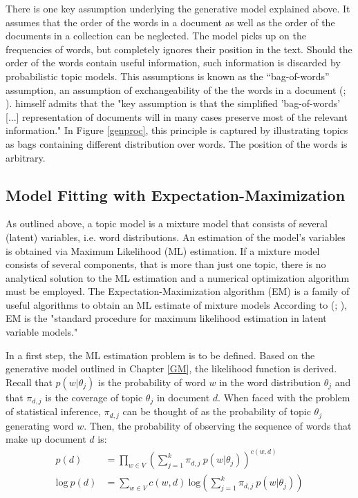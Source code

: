 \documentclass[11pt,a4paper,english,oneside]{book}
\numberwithin{equation}{chapter}
\begin{document}
There is one key assumption underlying the generative model explained above. It assumes that the order of the words in a document as well as the order of the documents in a collection can be neglected. The model picks up on the frequencies of words, but completely ignores their position in the text. Should the order of the words contain useful information, such information is discarded by probabilistic topic models. This assumptions is known as the “bag-of-words” assumption, an assumption of exchangeability of the the words in a document (\citealt[p.~994]{Blei.2003}; \citealt[~p. 3]{Steyvers(2007)}). \citet[~p. 290]{Hofmann.1999} himself admits that the "key assumption is that the simplified 'bag-of-words' [...] representation of documents will in many cases preserve most of the relevant information." In Figure \ref{genproc}, this principle is captured by illustrating topics as bags containing different distribution over words. The position of the words is arbitrary.
 
\subsection{Model Fitting with Expectation-Maximization}\label{Ch:model}

As outlined above, a topic model is a mixture model that consists of several (latent) variables, i.e. word distributions. An estimation of the model's variables is obtained via Maximum Likelihood (ML) estimation. If a mixture model consists of several components, that is more than just one topic, there is no analytical solution to the ML estimation and a numerical optimization algorithm must be employed. The Expectation-Maximization algorithm (EM) is a family of useful algorithms to obtain an ML estimate of mixture models \cite[~p. 359]{Zhai.2016} According to \citeauthor{Hofmann.1999} (\citeyear[p. 290]{Hofmann.1999}; \citeyear[p. 181]{Hofmann.2001}), EM is the "standard procedure for maximum likelihood estimation in latent variable models." 

In a first step, the ML estimation problem is to be defined. Based on the generative model outlined in Chapter \ref{GM}, the likelihood function is derived. Recall that $p(w | \theta_j)$ is the probability of word $w$ in the word distribution $\theta_j$ and that $\pi_{d,j}$ is the coverage of topic $\theta_j$ in document $d$. When faced with the problem of statistical inference, $\pi_{d,j}$ can be thought of as the probability of topic $\theta_j$ generating word $w$. Then, the probability of observing the sequence of words that make up document $d$ is:
\begin{align}
\label{prob} p(d) &= \underset{w \in V}\prod \left( \sum_{j=1}^{k}\pi_{d,j} \ p(w|\theta_j) \right)^{c(w,d)}\\
\label{log} \text{log} \ p(d) &= \underset{w \in V}\sum c(w,d) \ \text{log} \left( \sum_{j=1}^{k}\pi_{d,j} \ p(w|\theta_j) \right)
\end{align}
\end{document}
